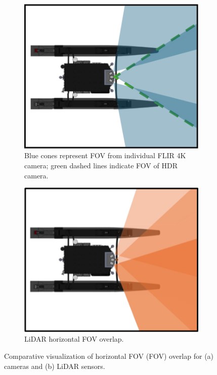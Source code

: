 \documentclass{erauthesis}
\begin{document}
\begin{figure}[htbp]
\centering
\begin{subfigure}[t]{0.48\textwidth}
    \centering
    \includegraphics[width=\textwidth]{Images/fov_cam.png}
    \caption{Blue cones represent \ac{FOV} from individual FLIR 4K camera; green dashed lines indicate \ac{FOV} of HDR camera.}
    \label{fig:fov_cam}
\end{subfigure}
\hfill
\begin{subfigure}[t]{0.48\textwidth}
    \centering
    \includegraphics[width=\textwidth]{Images/fov_LiDAR.png}
    \caption{LiDAR horizontal \ac{FOV} overlap.}
    \label{fig:fov_LiDAR}
\end{subfigure}
\caption{Comparative visualization of horizontal \ac{FOV} (FOV) overlap for (a) cameras and (b) LiDAR sensors.}
\label{fig:fov_combined}
\end{figure}
\end{document}
